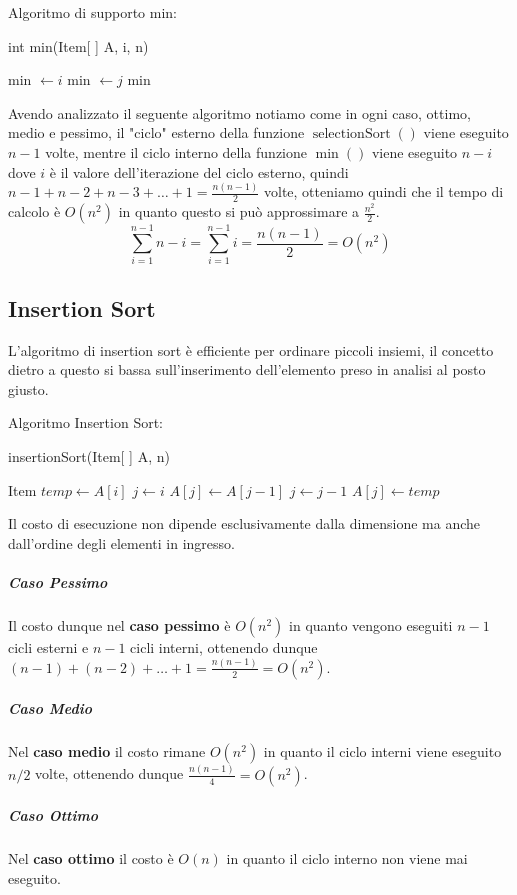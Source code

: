         Algoritmo di supporto min:
        \begin{algorithm}
            \caption{int min(Item[ ] A, \Int i, \Int n)}\label{alg:min}
            \begin{algorithmic}[1]
                \State \Int min $\gets i$
                        \State min $\gets j$
                    \EndIf
                \EndFor
                \State \Return min
            \end{algorithmic}
        \end{algorithm}
        Avendo analizzato il seguente algoritmo notiamo come in ogni caso, ottimo, medio e pessimo, il "ciclo" esterno della funzione $ \operatorname{selectionSort}() $ viene eseguito $ n-1 $ volte, mentre il ciclo interno della funzione $ \operatorname{min}() $ viene eseguito $ n-i $ dove $ i $ è il valore dell'iterazione del ciclo esterno, quindi $ n-1 + n-2 + n-3 + \ldots + 1 = \frac{n(n-1)}{2} $ volte, otteniamo quindi che il tempo di calcolo è $ O(n^2) $ in quanto questo si può approssimare a $ \frac{n^2}{2} $.
        $$  
            \sum_{i=1}^{n-1} n-i = \sum_{i=1}^{n-1} i = \frac{n(n-1)}{2}= O(n^2)
        $$
    \subsection{Insertion Sort}
        L'algoritmo di insertion sort è efficiente per ordinare piccoli insiemi, il concetto dietro a questo si bassa sull'inserimento dell'elemento preso in analisi al posto giusto.
        
        Algoritmo Insertion Sort:
        \begin{algorithm}
            \caption{insertionSort(Item[ ] A, \Int n)}\label{alg:insertionSort}
            \begin{algorithmic}[1]
                    \State Item $temp \gets A[i]$
                    \State \Int $j \gets i$
                        \State $A[j] \gets A[j-1]$
                        \State $j \gets j-1$
                    \EndWhile
                    \State $A[j] \gets temp$
                \EndFor
            \end{algorithmic}
        \end{algorithm}
        
        Il costo di esecuzione non dipende esclusivamente dalla dimensione ma anche dall'ordine degli elementi in ingresso.
        \subparagraph{Caso Pessimo} Il costo dunque nel \textbf{caso pessimo} è $ O(n^2) $ in quanto vengono eseguiti $ n-1 $ cicli esterni e $ n-1 $ cicli interni, ottenendo dunque $ (n-1) + (n-2) + \ldots + 1 = \frac{n(n-1)}{2} = O(n^2) $.
        \subparagraph{Caso Medio }Nel \textbf{caso medio} il costo rimane $ O(n^2) $ in quanto il ciclo interni viene eseguito $ n/2 $ volte, ottenendo dunque $ \frac{n(n-1)}{4} = O(n^2) $.
        \subparagraph{Caso Ottimo} Nel \textbf{caso ottimo} il costo è $ O(n) $ in quanto il ciclo interno non viene mai eseguito.
        
